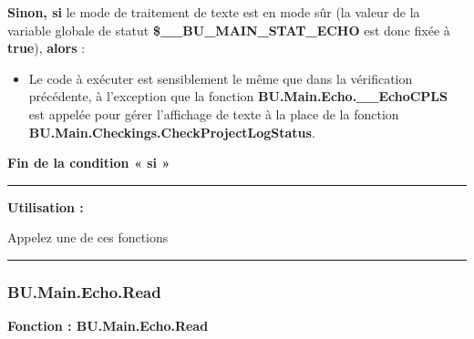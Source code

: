 \documentclass[a4paper,10pt]{article}
\begin{document}
    \setlength{\parskip}{1em}

    \begin{justify}
        \textbf{\color{cond}Sinon, si} le mode de traitement de texte est en mode sûr (la valeur de la variable globale de statut \textbf{\color{vars}\$\_\_BU\_MAIN\_STAT\_ECHO} est donc fixée à \textbf{true}), \textbf{\color{cond}alors} :

        \begin{itemize}
            \item
            {
                \begin{justify}
                    Le code à exécuter est sensiblement le même que dans la vérification précédente, à l'exception que la fonction \textbf{\color{func}BU.Main.Echo.\_\_EchoCPLS} est appelée pour gérer l'affichage de texte à la place de la fonction \textbf{\color{func}BU.Main.Checkings.CheckProjectLogStatus}.
                \end{justify}
            }
        \end{itemize}
    \end{justify}

    \begin{justify}
        \textbf{\color{cond}Fin de la condition « si »}
    \end{justify}


    \par\noindent\rule{\textwidth}{0.4pt}

    \begin{justify}
        \textbf{Utilisation :}

        Appelez une de ces fonctions
    \end{justify}



    \color{sec3}\par\noindent\rule{\textwidth}{0.4pt}\color{text}

    \color{sec3}
    \subsubsection{BU.Main.Echo.Read}\color{text}

    \begin{justify}
        \textbf{Fonction : \color{func}BU.Main.Echo.Read}
    \end{justify}
\end{document}
